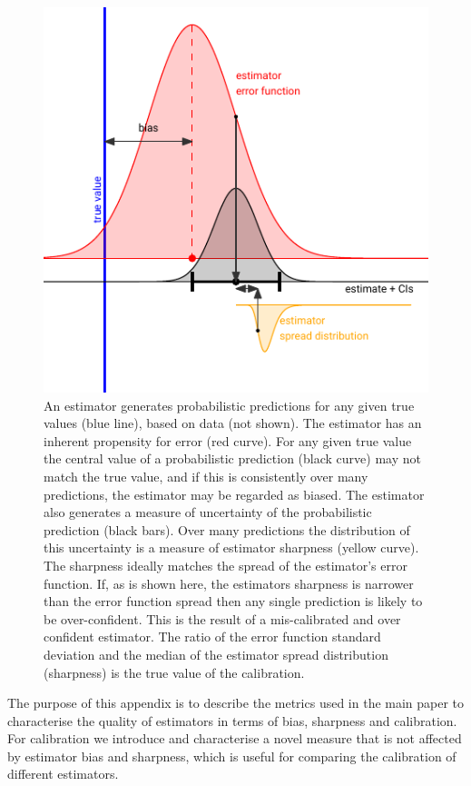 \documentclass[a4paper, 12pt, twoside]{article}
\begin{document}
\begin{figure}[ht!]
\centering
  \includegraphics{fig/fig1-introduction}
  \caption{An estimator generates probabilistic predictions for any given true values (blue line), based on data (not shown). The estimator has an inherent propensity for error (red curve). For any given true value the central value of a probabilistic prediction (black curve) may not match the true value, and if this is consistently over many predictions, the estimator may be regarded as biased. The estimator also generates a measure of uncertainty of the probabilistic prediction (black bars). Over many predictions the distribution of this uncertainty is a measure of estimator sharpness  (yellow curve). The sharpness ideally matches the spread of the estimator's error function. If, as is shown here, the estimators sharpness is narrower than the error function spread then any single prediction is likely to be over-confident. This is the result of a mis-calibrated and over confident estimator. The ratio of the error function standard deviation and the median of the estimator spread distribution (sharpness) is the true value of the calibration.}
\label{fig:S2.1}
\end{figure}

The purpose of this appendix is to describe the metrics used in the main paper to characterise the quality of estimators in terms of bias, sharpness and calibration. For calibration we introduce and characterise a novel measure that is not affected by estimator bias and sharpness, which is useful for comparing the calibration of different estimators.
\end{document}
